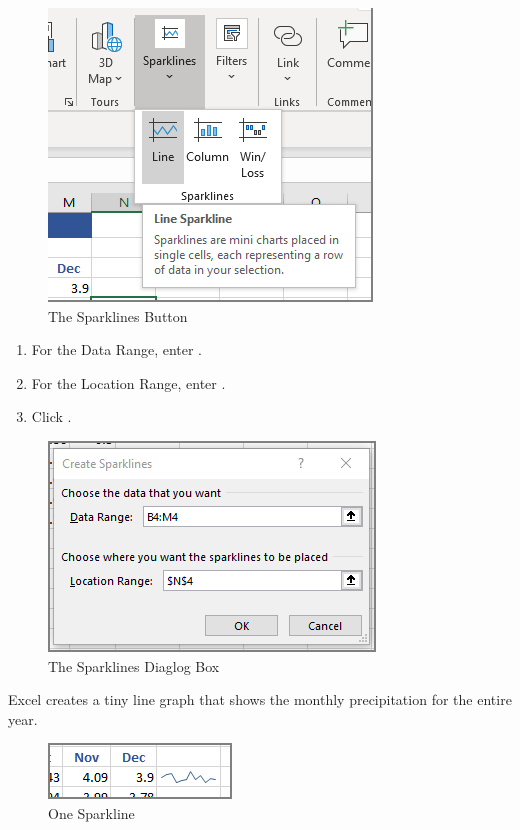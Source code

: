 \begin{figure}[H]
	\centering
	\includegraphics[width=\maxwidth{.65\linewidth}]{gfx/ch08_fig01}
	\caption{The Sparklines Button}
	\label{08:fig01}
\end{figure}

\begin{enumerate}[resume]
		
	\item For the Data Range, enter .
	\item For the Location Range, enter .
	\item Click .
\end{enumerate}

\begin{figure}[H]
	\centering
	\includegraphics[width=\maxwidth{.65\linewidth}]{gfx/ch08_fig02}
	\caption{The Sparklines Diaglog Box}
	\label{08:fig02}
\end{figure}

Excel creates a tiny line graph that shows the monthly precipitation for the entire year. 

\begin{figure}[H]
	\centering
	\includegraphics[width=\maxwidth{.50\linewidth}]{gfx/ch08_fig03}
	\caption{One Sparkline}
	\label{08:fig03}
\end{figure}

